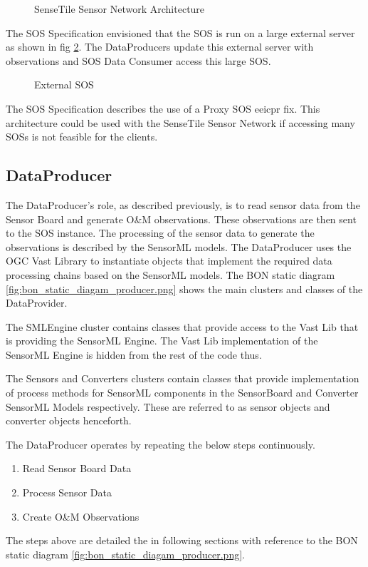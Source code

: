 \documentclass[]{final_report}
\begin{document}
\begin{figure}[h]
\caption{SenseTile Sensor Network Architecture}\label{fig:Deployment_network}
\end{figure}
The SOS Specification envisioned that the SOS is run on a large external server as shown in fig \ref{fig:Deployment_ext_sos}. The DataProducers update this external server with observations and SOS Data Consumer access this large SOS.
\begin{figure}[h]
\centering
{}
\caption{External SOS}\label{fig:Deployment_ext_sos}
\end{figure}

The SOS Specification describes the use of a Proxy SOS eeicpr fix. This architecture could be used with the SenseTile Sensor Network if accessing many SOSs is not feasible for the clients.


\newpage
\subsection{DataProducer}\label{DataProducerHigh}
The DataProducer's role, as described previously, is to read sensor data from the Sensor Board and generate O\&M observations. These observations are then sent to the SOS instance. The processing of the sensor data to generate the observations is described by the SensorML models. The DataProducer uses the OGC Vast Library to instantiate objects that implement the required data processing chains based on the SensorML models. The BON static diagram \ref{fig:bon_static_diagam_producer.png}
 shows the main clusters and classes of the DataProvider.

The SMLEngine cluster contains classes that provide access to
the Vast Lib that is providing the SensorML Engine.  The Vast Lib implementation
of the SensorML Engine is hidden from the rest of the code thus.

The Sensors and Converters clusters contain classes that provide
implementation of process methods for SensorML components in the SensorBoard and
Converter SensorML Models respectively. These are referred to as sensor objects and
converter objects henceforth.

The DataProducer operates by repeating the below steps continuously.
 \begin{enumerate}
\item Read Sensor Board Data
\item Process Sensor Data
\item Create O\&M Observations
\end{enumerate}
The steps above are detailed the in following sections with reference
to the BON static diagram \ref{fig:bon_static_diagam_producer.png}.
\end{document}
